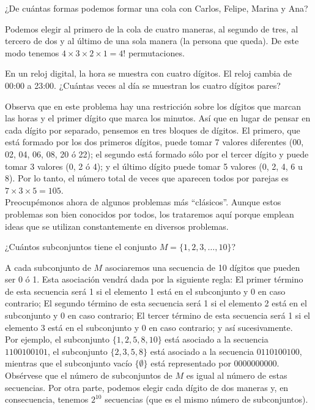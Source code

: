 \documentclass[11pt]{scrartcl}
\begin{document}
\begin{example}
¿De cuántas formas podemos formar una cola con Carlos, Felipe, Marina y Ana?
\end{example}

Podemos elegir al primero de la cola de cuatro maneras, al segundo de tres, al tercero de dos y al último de una sola manera (la persona que queda). De este modo tenemos \(4 \times 3 \times 2 \times 1 = 4!\) permutaciones.

\begin{example}
En un reloj digital, la hora se muestra con cuatro dígitos. El reloj cambia de 00:00 a 23:00. ¿Cuántas veces al día se muestran los cuatro dígitos pares?
\end{example}

Observa que en este problema hay una restricción sobre los dígitos que marcan las horas y el primer dígito que marca los minutos. Así que en lugar de pensar en cada dígito por separado, pensemos en tres bloques de dígitos. El primero, que está formado por los dos primeros dígitos, puede tomar 7 valores diferentes (00, 02, 04, 06, 08, 20 ó 22); el segundo está formado sólo por el tercer dígito y puede tomar 3 valores (0, 2 ó 4); y el último dígito puede tomar 5 valores (0, 2, 4, 6 u 8). Por lo tanto, el número total de veces que aparecen todos por parejas es \(7 \times 3 \times 5 = 105\).\\

Preocupémonos ahora de algunos problemas más ``clásicos''. Aunque estos problemas son bien conocidos por todos, los trataremos aquí porque emplean ideas que se utilizan constantemente en diversos problemas.

\begin{example}
¿Cuántos subconjuntos tiene el conjunto \( M = \{1, 2, 3, \ldots, 10\} \)?
\end{example}

A cada subconjunto de \( M \) asociaremos una secuencia de 10 dígitos que pueden ser 0 ó 1. Esta asociación vendrá dada por la siguiente regla: El primer término de esta secuencia será 1 si el elemento 1 está en el subconjunto y 0 en caso contrario; El segundo término de esta secuencia será 1 si el elemento 2 está en el subconjunto y 0 en caso contrario; El tercer término de esta secuencia será 1 si el elemento 3 está en el subconjunto y 0 en caso contrario; y así sucesivamente.\\

Por ejemplo, el subconjunto \(\{1, 2, 5, 8, 10\}\) está asociado a la secuencia \(1100100101\), el subconjunto \(\{2, 3, 5, 8\}\) está asociado a la secuencia \(0110100100\), mientras que el subconjunto vacío \(\{\emptyset\}\) está representado por \(0000000000\). Obsérvese que el número de subconjuntos de \( M \) es igual al número de estas secuencias. Por otra parte, podemos elegir cada dígito de dos maneras y, en consecuencia, tenemos \(2^{10}\) secuencias (que es el mismo número de subconjuntos).
\end{document}
